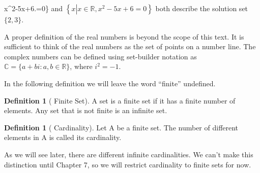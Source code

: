 \documentclass[10pt,]{book}
\theoremstyle{plain}
\theoremstyle{definition}
\newtheorem{definition}[theorem]{Definition}
\theoremstyle{definition}
\theoremstyle{definition}
\theoremstyle{definition}
\begin{document}
 \mid x^{2}-5x+6\right.=0\right\}\) and \(\left\{x \left| x\in \mathbb{R}, x^{2 }-5x+6\right.=0\right\}\) both describe the solution set \(\{2, 3\}\). 
%
\par
A proper definition of the real numbers is beyond the scope of this text. It is sufficient to think of the real numbers as the set of points on a
number line. The complex numbers can be defined using set-builder notation as \(\mathbb{C} = \{a + b i:a, b \in \mathbb{R}\}\), where \(i^2 = -1\).  %
\par
In the following definition we will leave the word ``finite'' undefined.   
%
\begin{definition}[ Finite Set]\label{finite-set}
A set is a finite set if it has a finite number of elements. Any set that is not finite is an infinite set.%
\end{definition}
\begin{definition}[ Cardinality]\label{cardinality.}
\label{notation-3}
Let A be a finite set. The number of different elements in A is called its cardinality.%
\end{definition}
\par
As we will see later, there are different infinite cardinalities. We can't make this distinction until Chapter 7, so we will restrict cardinality to finite sets for now.%
\typeout{************************************************}
\typeout{************************************************}
\end{document}
